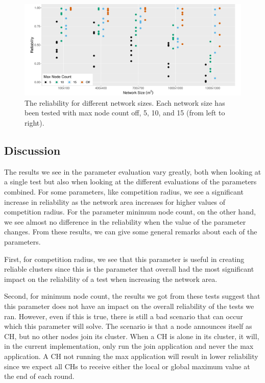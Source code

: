 \begin{figure}[bt]
    \centering
    \includegraphics[width=\textwidth, keepaspectratio]{figure/Results/ParameterEvaluation/MaxNodeCount_Reliability.pdf}
    \caption{The reliability for different network sizes. Each network size has been tested with max node count off, 5, 10, and 15 (from left to right).}
    \label{fig:nodes-per-cluster-ratio-reliability}
\end{figure}


\subsection{Discussion}
The results we see in the parameter evaluation vary greatly, both when looking at a single test but also when looking at the different evaluations of the parameters combined. For some parameters, like competition radius, we see a significant increase in reliability as the network area increases for higher values of competition radius. For the parameter minimum node count, on the other hand, we see almost no difference in the reliability when the value of the parameter changes. From these results, we can give some general remarks about each of the parameters.


First, for competition radius, we see that this parameter is useful in creating reliable clusters since this is the parameter that overall had the most significant impact on the reliability of a test when increasing the network area. 

Second, for minimum node count, the results we got from these tests suggest that this parameter does not have an impact on the overall reliability of the tests we ran. However, even if this is true, there is still a bad scenario that can occur which this parameter will solve. The scenario is that a node announces itself as CH, but no other nodes join its cluster. When a CH is alone in its cluster, it will, in the current implementation, only run the join application and never the max application. A CH not running the max application will result in lower reliability since we expect all CHs to receive either the local or global maximum value at the end of each round.

